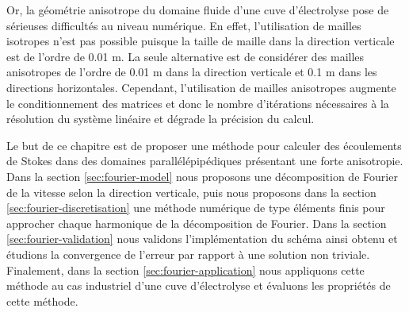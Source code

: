 Or, la géométrie anisotrope du domaine fluide d'une cuve d'électrolyse
pose de sérieuses difficultés au niveau numérique. En effet,
l'utilisation de mailles isotropes n'est pas possible puisque la
taille de maille dans la direction verticale est de l'ordre de
\num{0.01} \si{\meter}.  La seule alternative est de considérer des
mailles anisotropes de l'ordre de \num{0.01} \si{\meter} dans la
direction verticale et \num{0.1} \si{\meter} dans les directions
horizontales. Cependant, l'utilisation de mailles anisotropes
augmente le conditionnement des matrices et donc le nombre
d'itérations nécessaires à la résolution du système linéaire et
dégrade la précision du calcul.

Le but de ce chapitre est de proposer une méthode pour calculer des
écoulements de Stokes dans des domaines parallélépipédiques présentant
une forte anisotropie. Dans la section \ref{sec:fourier-model} nous
proposons une décomposition de Fourier de la vitesse selon la
direction verticale, puis nous proposons dans la section
\ref{sec:fourier-discretisation} une méthode numérique de type
éléments finis pour approcher chaque harmonique de la décomposition de
Fourier. Dans la section \ref{sec:fourier-validation} nous validons
l'implémentation du schéma ainsi obtenu et étudions la convergence de
l'erreur par rapport à une solution non triviale. Finalement, dans la
section \ref{sec:fourier-application} nous appliquons cette méthode au
cas industriel d'une cuve d'électrolyse et évaluons les propriétés de
cette méthode.

